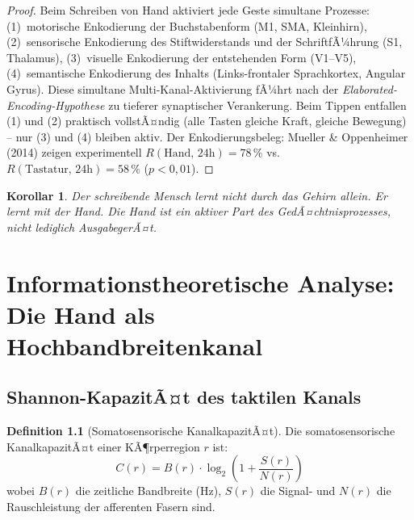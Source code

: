 ﻿\documentclass[12pt,a4paper]{report}
\theoremstyle{plain}
\newtheorem{korollar}[theorem]{Korollar}
\theoremstyle{definition}
\newtheorem{definition}[theorem]{Definition}
\theoremstyle{remark}
\begin{document}
\begin{proof}
Beim Schreiben von Hand aktiviert jede Geste simultane Prozesse:
(1)~motorische Enkodierung der Buchstabenform (M1, SMA, Kleinhirn),
(2)~sensorische Enkodierung des Stiftwiderstands und der SchriftfÃ¼hrung
(S1, Thalamus), (3)~visuelle Enkodierung der entstehenden Form (V1--V5),
(4)~semantische Enkodierung des Inhalts (Links-frontaler Sprachkortex,
Angular Gyrus). Diese simultane Multi-Kanal-Aktivierung fÃ¼hrt nach der
\emph{Elaborated-Encoding-Hypothese} \cite{craik1972} zu tieferer
synaptischer Verankerung. Beim Tippen entfallen (1) und (2) praktisch
vollstÃ¤ndig (alle Tasten gleiche Kraft, gleiche Bewegung) -- nur
(3) und (4) bleiben aktiv. Der Enkodierungsbeleg: Mueller \& Oppenheimer
(2014) zeigen experimentell $R(\text{Hand, 24h}) = 78\,\%$ vs.\
$R(\text{Tastatur, 24h}) = 58\,\%$ ($p < 0{,}01$).
\end{proof}

\begin{korollar}
Der schreibende Mensch lernt nicht durch das Gehirn allein.
Er lernt \emph{mit der Hand}. Die Hand ist ein aktiver Part
des GedÃ¤chtnisprozesses, nicht lediglich AusgabegerÃ¤t.
\end{korollar}

\chapter{Informationstheoretische Analyse: Die Hand als Hochbandbreitenkanal}
\label{chap:information}

\section{Shannon-KapazitÃ¤t des taktilen Kanals}

\begin{definition}[Somatosensorische KanalkapazitÃ¤t]
Die somatosensorische KanalkapazitÃ¤t einer KÃ¶rperregion $r$ ist:
\[
  C(r) = B(r) \cdot \log_2\!\left(1 + \frac{S(r)}{N(r)}\right)
\]
wobei $B(r)$ die zeitliche Bandbreite (Hz), $S(r)$ die Signal- und
$N(r)$ die Rauschleistung der afferenten Fasern sind.
\end{definition}
\end{document}

